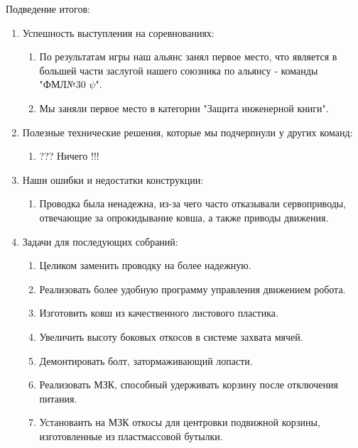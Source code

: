 Подведение итогов:
\begin{enumerate}
  \item Успешность выступления на соревнованиях:
  \begin{enumerate}
	\item По результатам игры наш альянс занял первое место, что является в большей части заслугой нашего союзника по альянсу - команды "ФМЛ№30 ${\psi}$".
	
	\item Мы заняли первое место в категории "Защита инженерной книги".
	
  \end{enumerate}
  
  \item Полезные технические решения, которые мы подчерпнули у других команд:
  \begin{enumerate}
	\item ??? Ничего !!!
	
  \end{enumerate}
  
  \item Наши ошибки и недостатки конструкции:
  \begin{enumerate}
  	\item Проводка была ненадежна, из-за чего часто отказывали сервоприводы, отвечающие за опрокидывание ковша, а также приводы движения.
  	
  \end{enumerate}
  
  \item Задачи для последующих собраний:
  \begin{enumerate}
  	\item Целиком заменить проводку на более надежную.
  	
  	\item Реализовать более удобную программу управления движением робота.
  	
  	\item Изготовить ковш из качественного листового пластика.
  	
  	\item Увеличить высоту боковых откосов в системе захвата мячей.
  	
  	\item Демонтировать болт, затормаживающий лопасти.
  	
  	\item Реализовать МЗК, способный удерживать корзину после отключения питания.
  	  	
  	\item Установаить на МЗК откосы для центровки подвижной корзины, изготовленные из пластмассовой бутылки.
  	
  \end{enumerate}
  
\end{enumerate}
\fillpage